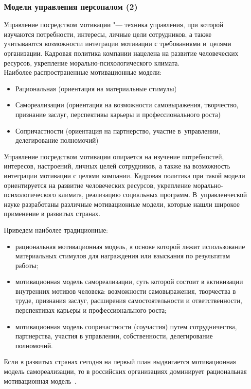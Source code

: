 \documentclass{../industrial-development}
\begin{document}
	\begin{frame} \frametitle{Модели управления персоналом (2)}
		\alert{Управление посредством мотивации} "--- техника управления, при которой изучаются потребности, интересы, личные цели сотрудников, а также учитываются возможности интеграции мотивации с требованиями и~целями организации. Кадровая политика компании нацелена на развитие человеческих ресурсов, укрепление морально-психологического климата. 
		\\ Наиболее распространенные мотивационные модели:
		\begin{itemize}
			\item Рациональная (ориентация на материальные стимулы)
			\item Самореализации (ориентация на возможности самовыражения,
			творчество, признание заслуг, перспективы карьеры и профессионального роста)
			\item Сопричастности (ориентация на партнерство, участие в~управлении, делегирование полномочий)
		\end{itemize}
	\end{frame}
	\lecturenotes
	
	\alert{Управление посредством мотивации} опирается на изучение потребностей, интересов, настроений, личных целей сотрудников, а также на возможность интеграции мотивации с целями компании. Кадровая политика при такой модели ориентируется на развитие человеческих ресурсов, укрепление морально-психологического климата, реализацию социальных программ. В~управленческой науке разработаны различные мотивационные модели, которые нашли широкое применение в развитых странах.
	
	Приведем наиболее традиционные:
	\begin{itemize}
		\item рациональная мотивационная модель, в основе которой лежит использование материальных стимулов для награждения или взыскания по результатам работы;
		\item мотивационная модель самореализации, суть которой состоит в активизации внутренних мотивов человека: возможности самовыражения, творчества в труде, признания заслуг, расширения самостоятельности и ответственности, перспективах карьеры и профессионального роста;
		\item мотивационная модель сопричастности (соучастия) путем сотрудничества, партнерства, участия в управлении, собственности, делегирование полномочий.
	\end{itemize}
	Если в развитых странах сегодня на первый план выдвигается мотивационная модель самореализации, то в российских организациях доминирует рациональная мотивационная модель~\cite{Porshnev}. 
	
\end{document}
